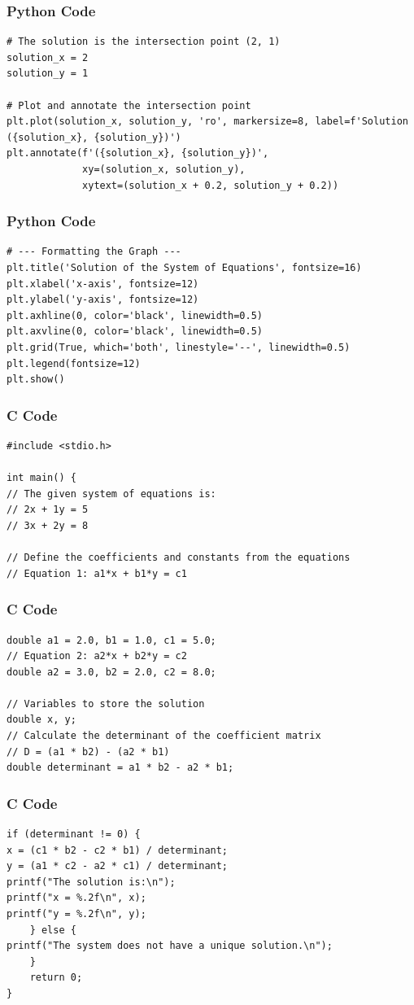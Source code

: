 \documentclass{beamer}
\begin{document}
\begin{frame}[fragile]
\frametitle{Python Code}
\begin{lstlisting}
# The solution is the intersection point (2, 1)
solution_x = 2
solution_y = 1

# Plot and annotate the intersection point
plt.plot(solution_x, solution_y, 'ro', markersize=8, label=f'Solution ({solution_x}, {solution_y})')
plt.annotate(f'({solution_x}, {solution_y})', 
             xy=(solution_x, solution_y), 
             xytext=(solution_x + 0.2, solution_y + 0.2))
\end{lstlisting}
\end{frame}

\begin{frame}[fragile]
\frametitle{Python Code}
\begin{lstlisting}
# --- Formatting the Graph ---
plt.title('Solution of the System of Equations', fontsize=16)
plt.xlabel('x-axis', fontsize=12)
plt.ylabel('y-axis', fontsize=12)
plt.axhline(0, color='black', linewidth=0.5)
plt.axvline(0, color='black', linewidth=0.5)
plt.grid(True, which='both', linestyle='--', linewidth=0.5)
plt.legend(fontsize=12)
plt.show()
\end{lstlisting}
\end{frame}

\begin{frame}[fragile]
\frametitle{C Code}
\begin{lstlisting}
#include <stdio.h>

int main() {
// The given system of equations is:
// 2x + 1y = 5
// 3x + 2y = 8

// Define the coefficients and constants from the equations
// Equation 1: a1*x + b1*y = c1
\end{lstlisting}
\end{frame}

\begin{frame}[fragile]
\frametitle{C Code}
\begin{lstlisting}
double a1 = 2.0, b1 = 1.0, c1 = 5.0;
// Equation 2: a2*x + b2*y = c2
double a2 = 3.0, b2 = 2.0, c2 = 8.0;

// Variables to store the solution
double x, y;
// Calculate the determinant of the coefficient matrix
// D = (a1 * b2) - (a2 * b1)
double determinant = a1 * b2 - a2 * b1;
\end{lstlisting}
\end{frame}

\begin{frame}[fragile]
\frametitle{C Code}
\begin{lstlisting}
if (determinant != 0) {
x = (c1 * b2 - c2 * b1) / determinant;
y = (a1 * c2 - a2 * c1) / determinant;
printf("The solution is:\n");
printf("x = %.2f\n", x);
printf("y = %.2f\n", y);
    } else {
printf("The system does not have a unique solution.\n");
    }
    return 0;
}
\end{lstlisting}
\end{frame}
\end{document}
